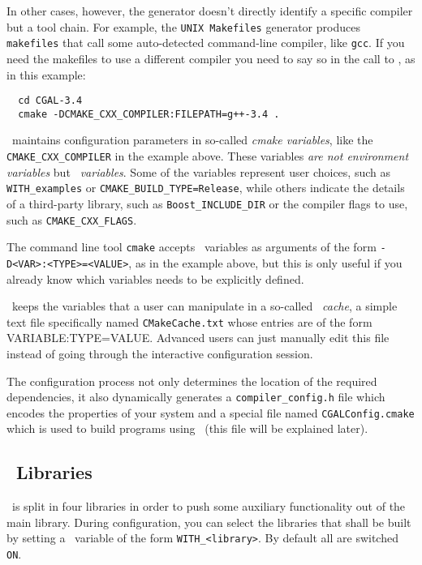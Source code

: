 In other cases, however, the generator doesn't directly identify a specific compiler but a tool chain.
For example, the \texttt{UNIX Makefiles} generator produces \texttt{makefiles} that call some auto-detected
command-line compiler, like \texttt{gcc}. If you need the makefiles to use a different compiler you need to
say so in the call to \cmake{}, as in this example:

{\ccTexHtml{\scriptsize}{}
\begin{verbatim}
  cd CGAL-3.4
  cmake -DCMAKE_CXX_COMPILER:FILEPATH=g++-3.4 . 
\end{verbatim}
}


\cmake\ maintains configuration parameters in so-called {\em cmake variables}, like the \texttt{CMAKE\_CXX\_COMPILER}
in the example above. These variables {\em are not environment variables} but {\em \cmake\ variables}. Some of the \cmake{} 
variables represent user choices, such as \texttt{WITH\_examples} or \texttt{CMAKE\_BUILD\_TYPE=Release}, while others
indicate the details of a third-party library, such as \texttt{Boost\_INCLUDE\_DIR} or the compiler flags to use,
such as \texttt{CMAKE\_CXX\_FLAGS}. 

The command line tool \texttt{cmake} accepts \cmake\ variables as arguments of the form \texttt{-D<VAR>:<TYPE>=<VALUE>}, as
in the example above, but this is only useful if you already know which variables needs to be explicitly defined.

\begin{ccAdvanced}
\cmake\ keeps the variables that a user can manipulate in a so-called {\em \cmake\ cache}, a simple text file specifically 
named \texttt{CMakeCache.txt} whose entries are of the form VARIABLE:TYPE=VALUE. Advanced users can just manually edit this 
file instead of going through the interactive configuration session.
\end{ccAdvanced}


The configuration process not only determines the location of the required dependencies, it also dynamically generates a
\texttt{compiler\_config.h} file which encodes the properties of your system and a special file named 
\texttt{CGALConfig.cmake} which is used to build programs using \cgal\ (this file will be explained later).

\subsection{\cgal\ Libraries}

\cgal\ is split in four libraries in order to push some auxiliary 
functionality out of the main library. During configuration, you can select the libraries that 
shall be built by setting a \cmake\ variable of the form {\tt WITH\_<library>}. By default all 
are switched \texttt{ON}.

